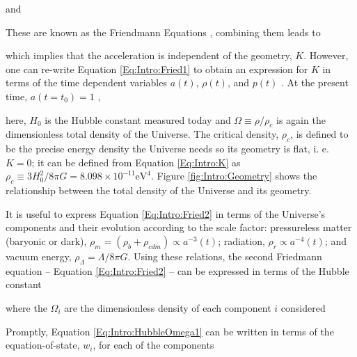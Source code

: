 and


\qquad These are known as the Friendmann Equations \citep{1922Friedmann,1924FriedmannCurvature}, combining them leads to

which implies that the acceleration is independent of the geometry, $K$. However, one can re-write Equation \eqref{Eq:Intro:Fried1} to obtain an expression for $K$ in terms of the time dependent variables $a(t)$, $\rho (t)$, and $p(t)$ \citep{padmanabhan_1999}. At the present time, $a(t=t_0) = 1$ \citep{1924FriedmannCurvature}, 

here, $H_0$ is the Hubble constant measured today and $\Omega \equiv \rho/\rho_c$ is again the dimensionless total density of the Universe. The critical density, $\rho_c$, is defined to be the precise energy density the Universe needs so its geometry is flat, i. e. $K=0$; it can be defined from Equation \eqref{Eq:Intro:K} as $\rho_c \equiv 3H_0^2/8\pi G = 8.098 \times 10^{-11} \text{eV}^{4}$. Figure \ref{fig:Intro:Geometry} shows the relationship between the total density of the Universe and its geometry.

\qquad It is useful to express Equation \eqref{Eq:Intro:Fried2} in terms of the Universe's components and their evolution according to the scale factor: pressureless matter (baryonic or dark), $\rho_m = (\rho_{b} + \rho_{cdm}) \propto a^{-3}(t)$; radiation, $\rho_r \propto a^{-4}(t)$; and vacuum energy, $\rho_{\Lambda} = \Lambda/8\pi G$. Using these relations, the second Friedmann equation -- Equation \eqref{Eq:Intro:Fried2} -- can be expressed in terms of the Hubble constant

where the $\Omega_i$ are the dimensionless density of each component $i$ considered

Promptly, Equation \eqref{Eq:Intro:HubbleOmega1} can be written in terms of the equation-of-state, $w_i$, for each of the components


